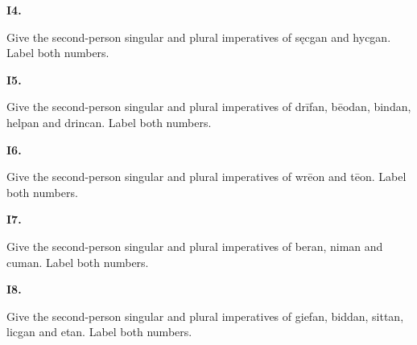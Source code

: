 \par\begin{minipage}{\linewidth}\raggedright
\textbf{I4.}

Give the second-person singular and plural imperatives of sęcgan and hycgan. Label both numbers.

\end{minipage}\par\addvspace{4pt}

\par\begin{minipage}{\linewidth}\raggedright
\textbf{I5.}

Give the second-person singular and plural imperatives of drīfan, bēodan, bindan, helpan and drincan. Label both numbers.

\end{minipage}\par\addvspace{4pt}

\par\begin{minipage}{\linewidth}\raggedright
\textbf{I6.}

Give the second-person singular and plural imperatives of wrēon and tēon. Label both numbers.

\end{minipage}\par\addvspace{4pt}

\par\begin{minipage}{\linewidth}\raggedright
\textbf{I7.}

Give the second-person singular and plural imperatives of beran, niman and cuman. Label both numbers.

\end{minipage}\par\addvspace{4pt}

\par\begin{minipage}{\linewidth}\raggedright
\textbf{I8.}

Give the second-person singular and plural imperatives of giefan, biddan, sittan, licgan and etan. Label both numbers.

\end{minipage}\par\addvspace{4pt}

